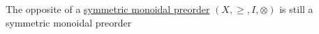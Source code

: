 The opposite of a \href{doc/1 math/Seven Sketches in Compositionality/Chapter 2: Resource theories/2 Symmetric monoidal preorders/1 Definition and first examples/1 Symmetric monoidal structure on a preorder}{symmetric monoidal preorder} $(X, \geq, I, \otimes)$ is still a symmetric monoidal preorder